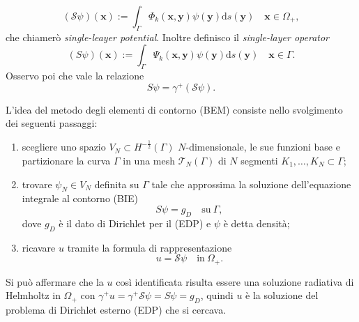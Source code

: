 \begin{equation}
	(\mathcal{S} \psi)(\textbf{x}) := \int_{\Gamma} \Phi_k(\textbf{x},\textbf{y}) \psi(\textbf{y}) \mathrm{d}s(\textbf{y}) \quad \textbf{x} \in \Omega_+,
\end{equation}
che chiamerò \textit{single-leayer potential}. Inoltre definisco il \textit{single-layer operator}
\begin{equation}
	(S \psi) (\textbf{x}) := \int_\Gamma \Psi_k(\textbf{x},\textbf{y}) \psi(\textbf{y}) \mathrm{d}s(\textbf{y}) \quad \textbf{x} \in \Gamma.
\end{equation}
Osservo poi che vale la relazione
\begin{equation}
	S \psi = \gamma^+ (\mathcal{S} \psi).
\end{equation}

L'idea del metodo degli elementi di contorno (BEM) consiste nello svolgimento dei seguenti passaggi:
\begin{enumerate}
	\item scegliere uno spazio $V_N \subset H^{-\frac{1}{2}}(\Gamma)$ $N$-dimensionale, le sue funzioni base e partizionare la curva $\Gamma$ in una mesh $\mathcal{T}_N(\Gamma)$ di $N$ segmenti $K_1,\dots,K_N \subset \Gamma$;
	\item trovare $\psi_N \in V_N$ definita su $\Gamma$ tale che approssima la soluzione dell'equazione integrale al contorno (BIE)
	\begin{equation} \label{BIE}
		S\psi = g_D \quad \text{su} \ \Gamma,
	\end{equation}
	dove $g_D$ è il dato di Dirichlet per il (EDP) e $\psi$ è detta densità;
	\item ricavare $u$ tramite la formula di rappresentazione
	\begin{equation}
		u = \mathcal{S} \psi \quad \text{in} \ \Omega_{+}.
	\end{equation}
\end{enumerate}
Si può affermare che la $u$ così identificata risulta essere una soluzione radiativa di Helmholtz in $\Omega_{+}$ con $\gamma^+ u = \gamma^+ \mathcal{S} \psi = S\psi = g_D$, quindi $u$ è la soluzione del problema di Dirichlet esterno (EDP) che si cercava.



